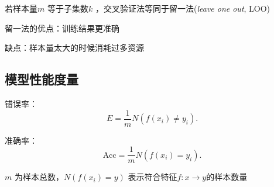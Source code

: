 \begin{notation}
    若样本量$m$ 等于子集数$k$ ，交叉验证法等同于留一法(\textit{leave one out}, LOO)

    留一法的优点：训练结果更准确

    缺点：样本量太大的时候消耗过多资源
\end{notation}
\subsection{模型性能度量}%
\label{sub:模型性能度量}
\begin{notation}
    错误率：\[
        E=\frac{1}{m} N\left( f\left( x_{i} \right) \neq y_{i} \right) 
    .\] 

    准确率：\[
        \text{Acc}=\frac{1}{m} N\left( f\left( x_{i} \right) =y_{i} \right) 
    .\] 

    $m$ 为样本总数，$N\left( f\left( x_{i} \right) =y \right) $ 表示符合特征$f:x\to y$的样本数量
\end{notation}






